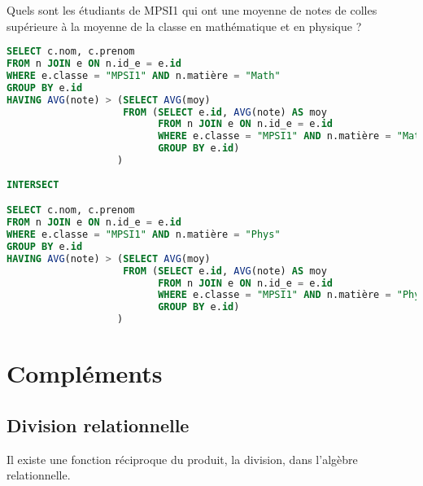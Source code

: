 \begin{Exercise}
Quels sont les étudiants de MPSI1 qui ont une moyenne de notes de colles supérieure à la moyenne de la classe en mathématique et en physique ?
\end{Exercise}
\begin{Answer}
\begin{lstlisting}[language=SQL]
SELECT c.nom, c.prenom
FROM n JOIN e ON n.id_e = e.id
WHERE e.classe = "MPSI1" AND n.matière = "Math"
GROUP BY e.id
HAVING AVG(note) > (SELECT AVG(moy)
                    FROM (SELECT e.id, AVG(note) AS moy 
                          FROM n JOIN e ON n.id_e = e.id
                          WHERE e.classe = "MPSI1" AND n.matière = "Math"
                          GROUP BY e.id)
                   )
                   
INTERSECT

SELECT c.nom, c.prenom
FROM n JOIN e ON n.id_e = e.id
WHERE e.classe = "MPSI1" AND n.matière = "Phys"
GROUP BY e.id
HAVING AVG(note) > (SELECT AVG(moy)
                    FROM (SELECT e.id, AVG(note) AS moy 
                          FROM n JOIN e ON n.id_e = e.id
                          WHERE e.classe = "MPSI1" AND n.matière = "Phys"
                          GROUP BY e.id)
                   )
\end{lstlisting}
\end{Answer}
\newpage
\section{Compléments} 
\subsection{Division relationnelle}
Il existe une fonction réciproque du produit, la division, dans l'algèbre relationnelle. 

